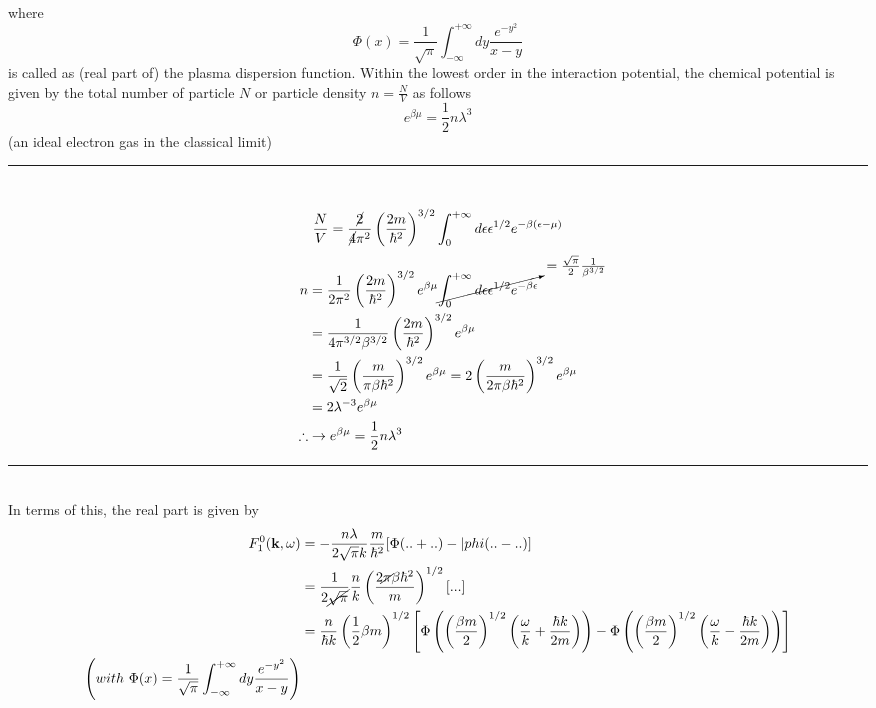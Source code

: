 where 
\begin{equation}
\Phi(x)=\frac{1}{\sqrt \pi} \int_{-\infty}^{+\infty} dy \frac{e^{-y^2}}{x-y}
\end{equation}
is called as (real part of) the plasma dispersion function.
 Within the lowest order in the interaction potential, the chemical potential is given by the total number of particle $N$ or particle density $n=\frac{N}{V}$ as follows
\begin{equation}
e^{\beta\mu}=\frac{1}{2}n\lambda^3
\end{equation}
(an ideal electron gas in the classical limit)\\
\rule{\textwidth}{0.1mm}\\
\[
\frac{N}{V}=\frac{\cancel{2}}{\cancel{4}\pi^2} \left( \frac{2m}{\hbar^2} \right)^{3/2} \int_0^{+\infty} d\epsilon \epsilon^{1/2} e^{-\beta(\epsilon-\mu)}
\]
\[
\begin{aligned}
n&=\frac{1}{2\pi^2} \left(\frac{2m}{\hbar^2}\right)^{3/2} e^{\beta\mu} \cancelto{=\frac{\sqrt \pi}{2}\frac{1}{\beta^{3/2}}}{\int_0^{+\infty} d\epsilon \epsilon^{1/2} e^{-\beta\epsilon}}\\
&=\frac{1}{4\pi^{3/2}\beta^{3/2}} \left(\frac{2m}{\hbar^2}\right)^{3/2} e^{\beta\mu} \\
&=\frac{1}{\sqrt 2} \left( \frac{m}{\pi \beta \hbar^2} \right)^{3/2} e^{\beta \mu}=2 \left( \frac{m}{2\pi \beta \hbar^2} \right)^{3/2} e^{\beta \mu}\\
&=2\lambda^{-3}e^{\beta\mu}\\
\therefore& \to e^{\beta\mu}=\frac{1}{2}n\lambda^3
\end{aligned}
\]
\rule{\textwidth}{0.1mm}\\
In terms of this, the real part is given by
\begin{equation}
\begin{aligned}
F^0_1(\mathbf k,\omega)&=-\frac{n\lambda}{2\sqrt \pi k}\frac{m}{\hbar^2} [\Phi(..+..)-|phi(..-..)]\\
&=\frac{1}{2\cancel{\sqrt \pi}} \frac{n}{k} \left( \frac{2\cancel{\pi}\beta\hbar^2}{m} \right)^{1/2} [...]\\
&=\frac{n}{\hbar k} \left( \frac{1}{2}\beta m \right)^{1/2} \left[ \Phi \left(\left(\frac{\beta m}{2}\right)^{1/2} \left( \frac{\omega}{k}+\frac{\hbar k}{2m} \right)\right)- \Phi \left(\left(\frac{\beta m}{2}\right)^{1/2} \left( \frac{\omega}{k}-\frac{\hbar k}{2m} \right)\right) \right]\\
\left( with\ \Phi(x)=\frac{1}{\sqrt \pi} \int_{-\infty}^{+\infty} dy \frac{e^{-y^2}}{x-y} \right)
\end{aligned}
\end{equation}
